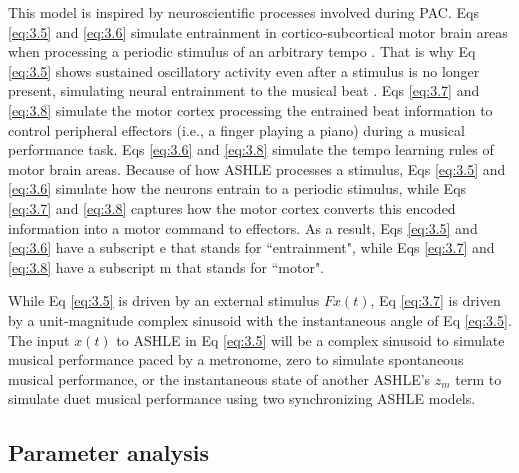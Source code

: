 \documentclass{report}
\begin{document}
This model is inspired by neuroscientific processes involved during PAC. Eqs \eqref{eq:3.5} and \eqref{eq:3.6} simulate entrainment in cortico-subcortical motor brain areas when processing a periodic stimulus of an arbitrary tempo \cite{daly2014changes, grahn2009feeling, grahn2013finding}. That is why Eq \eqref{eq:3.5} shows sustained oscillatory activity even after a stimulus is no longer present, simulating neural entrainment to the musical beat \cite{large2015neural}. Eqs \eqref{eq:3.7} and \eqref{eq:3.8} simulate the motor cortex processing the entrained beat information to control peripheral effectors (i.e., a finger playing a piano) during a musical performance task. Eqs \eqref{eq:3.6} and \eqref{eq:3.8} simulate the tempo learning rules of motor brain areas. Because of how ASHLE processes a stimulus, Eqs \eqref{eq:3.5} and \eqref{eq:3.6} simulate how the neurons entrain to a periodic stimulus, while Eqs \eqref{eq:3.7} and \eqref{eq:3.8} captures how the motor cortex converts this encoded information into a motor command to effectors. As a result, Eqs \eqref{eq:3.5} and \eqref{eq:3.6} have a subscript e that stands for ``entrainment", while Eqs \eqref{eq:3.7} and \eqref{eq:3.8} have a subscript m that stands for ``motor".

While Eq \eqref{eq:3.5} is driven by an external stimulus $Fx(t)$, Eq \eqref{eq:3.7} is driven by a unit-magnitude complex sinusoid with the instantaneous angle of Eq \eqref{eq:3.5}. The input $x(t)$ to ASHLE in Eq \eqref{eq:3.5} will be a complex sinusoid to simulate musical performance paced by a metronome, zero to simulate spontaneous musical performance, or the instantaneous state of another ASHLE's $z_m$ term to simulate duet musical performance using two synchronizing ASHLE models.

\subsection{Parameter analysis}
\end{document}
